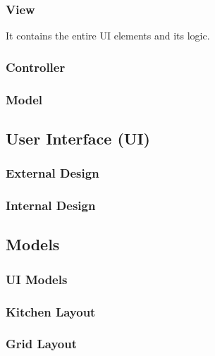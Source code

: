 \subsubsection{View}\label{subsubsec:view}
It contains the entire UI elements and its logic.
\subsubsection{Controller}\label{subsubsec:controller}
\subsubsection{Model}\label{subsubsec:model}

\subsection{User Interface (UI)}\label{subsec:ui}
\subsubsection{External Design}\label{subsubsec:uiextdesign}
\subsubsection{Internal Design}\label{subsubsec:uiintdesign}

\subsection{Models}\label{subsec:models}
\subsubsection{UI Models}\label{subsubsec:uimodels}
\subsubsection{Kitchen Layout}\label{subsubsec:kitchen}
\subsubsection{Grid Layout}\label{subsubsec:grid}






